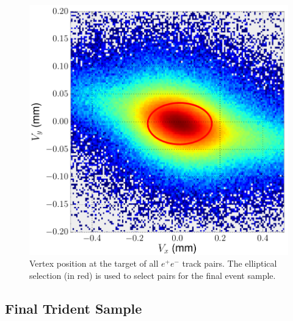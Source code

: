 \begin{figure}[h!t]
    \centering
    \includegraphics[width=.9\textwidth]{images/20160503_vertex_xy.png}
    \caption{Vertex position at the target of all $e^+e^-$ track pairs.  The
             elliptical selection (in red) is used to select pairs for the 
             final event sample.}
    \label{fig:vertex_xy}
\end{figure}  

\subsection{Final Trident Sample}

